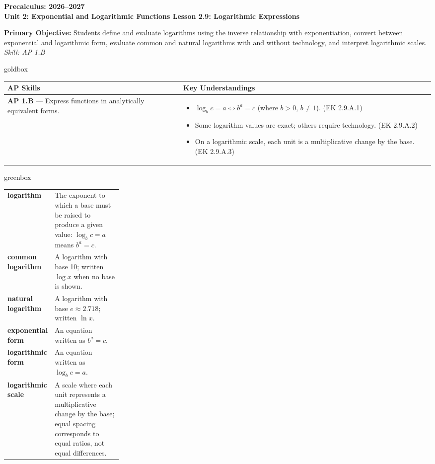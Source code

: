 \documentclass[10pt]{article}
\newcommand{\CourseName}{Precalculus}
\newcommand{\SchoolYear}{2026--2027}
\newcommand{\UnitNumberName}{Unit 2: Exponential and Logarithmic Functions \quad}
\newcommand{\LessonNumberName}{Lesson 2.9: Logarithmic Expressions}
\begin{document}
\begin{center}
    {\Large\bfseries \CourseName: \SchoolYear \\
    {\small\bfseries \UnitNumberName \LessonNumberName}}
\end{center}

\begin{tcolorbox}[colback=sky, colframe=navy, boxrule=0.9pt, arc=2mm,
    left=2mm, right=2mm, top=1.5mm, bottom=1.5mm]
    \textbf{Primary Objective:} Students define and evaluate logarithms using the inverse
    relationship with exponentiation, convert between exponential and logarithmic form, evaluate
    common and natural logarithms with and without technology, and interpret logarithmic scales.
    \hfill\textit{\small Skill: AP 1.B}
\end{tcolorbox}

\renewcommand{\arraystretch}{1.6}
\begin{skillbox}{goldbox}
\begin{tabularx}{\linewidth}{@{}X X@{}}
\textbf{AP Skills} &
\textbf{Key Understandings} \\
\midrule
\textbf{AP 1.B} --- Express functions in analytically equivalent forms. &
\begin{itemize}[leftmargin=1.2em,itemsep=2pt,topsep=0pt]
  \item $\log_b c = a \Leftrightarrow b^a = c$ (where $b > 0$, $b \ne 1$). (EK 2.9.A.1)
  \item Some logarithm values are exact; others require technology. (EK 2.9.A.2)
  \item On a logarithmic scale, each unit is a multiplicative change by the base. (EK 2.9.A.3)
\end{itemize} \\
\end{tabularx}
\end{skillbox}

\begin{skillbox}{greenbox}
\renewcommand{\arraystretch}{1.4}
\begin{tabularx}{\linewidth}{@{} >{\bfseries\color{navy}}p{0.27\linewidth} X @{}}
logarithm            & The exponent to which a base must be raised to produce a given value:
                       $\log_b c = a$ means $b^a = c$. \\
common logarithm     & A logarithm with base 10; written $\log x$ when no base is shown. \\
natural logarithm    & A logarithm with base $e \approx 2.718$; written $\ln x$. \\
exponential form     & An equation written as $b^a = c$. \\
logarithmic form     & An equation written as $\log_b c = a$. \\
logarithmic scale    & A scale where each unit represents a multiplicative change by the base;
                       equal spacing corresponds to equal ratios, not equal differences. \\
\end{tabularx}
\end{skillbox}
\end{document}
